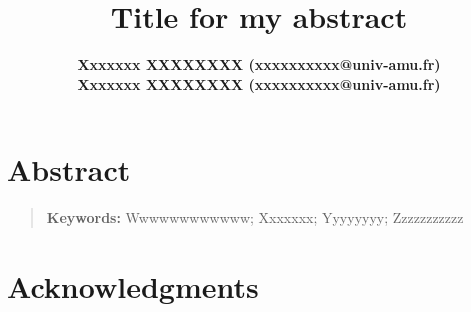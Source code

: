 \documentclass[10pt,letterpaper]{article}
\title{ Title for my abstract}
\author{
{\large \bf Xxxxxxx XXXXXXXX (xxxxxxxxxx@univ-amu.fr)} \\
{\large \bf Xxxxxxx XXXXXXXX (xxxxxxxxxx@univ-amu.fr)} \\
}
\begin{document}
\maketitle

\begin{quote}
\small
\lipsum[1][1-2]
\end{quote}


\section{Abstract}
{\bf
\lipsum[1]
}
\begin{quote}
\small
\textbf{Keywords:} 
Wwwwwwwwwwww; Xxxxxxx; Yyyyyyyy; Zzzzzzzzzzz
\end{quote}


\section{Acknowledgments}

\lipsum[1][1-5]



\setlength{\bibleftmargin}{.125in}
\setlength{\bibindent}{-\bibleftmargin}


\end{document}
